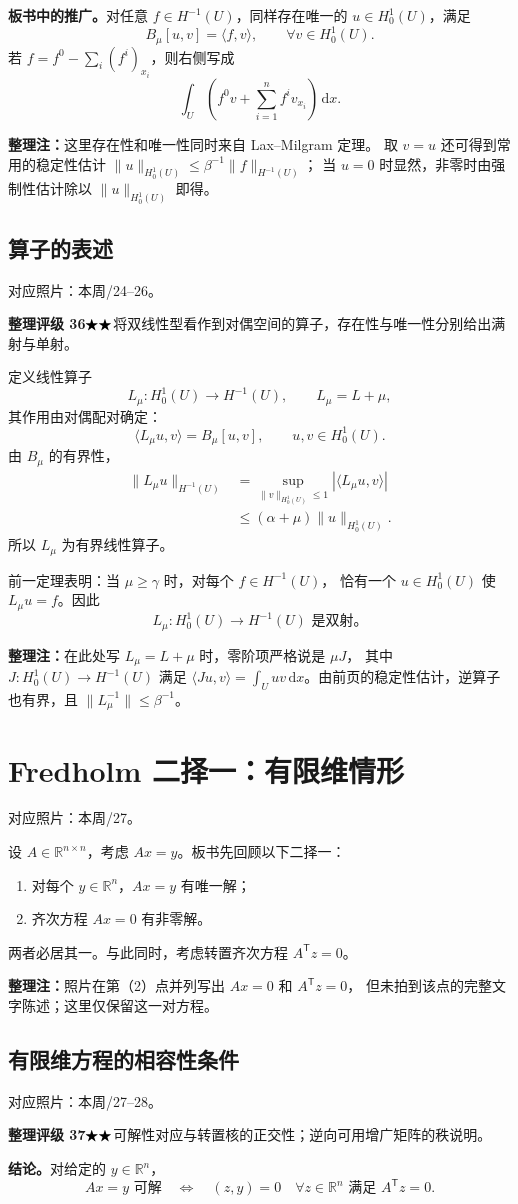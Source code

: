 \documentclass[UTF8,a4paper,11pt,fontset=fandol]{ctexart}
\newcommand{\R}{\mathbb R}
\newcommand{\dd}{\,\mathrm d}
\newcommand{\ednote}[1]{\par{\small\color{notegray}\textbf{整理注：}#1}\par}
\newcommand{\source}[1]{{\small\color{notegray}对应照片：#1。}\par}
\newcommand{\proofstars}[1]{\ensuremath{%
\ifnum#1>0\relax\bigstar\fi
\ifnum#1>1\relax\bigstar\fi
\ifnum#1>2\relax\bigstar\fi
\ifnum#1>3\relax\bigstar\fi
\ifnum#1>4\relax\bigstar\fi}}
\newcommand{\proofrating}[3]{\par{\small\color{proofblue}%
\textbf{整理评级 #1}\enspace\proofstars{#2}\quad #3\par}}
\begin{document}
\textbf{板书中的推广。}对任意 $f\in H^{-1}(U)$，同样存在唯一的
$u\in H_0^1(U)$，满足
\[
\boxed{B_\mu[u,v]=\langle f,v\rangle,\qquad\forall v\in H_0^1(U).}
\]
若 $f=f^0-\sum_i(f^i)_{x_i}$，则右侧写成
\[
\int_U\left(f^0v+\sum_{i=1}^nf^iv_{x_i}\right)\dd x.
\]
\ednote{这里存在性和唯一性同时来自 Lax--Milgram 定理。
取 $v=u$ 还可得到常用的稳定性估计
$\|u\|_{H_0^1(U)}\leq\beta^{-1}\|f\|_{H^{-1}(U)}$；
当 $u=0$ 时显然，非零时由强制性估计除以 $\|u\|_{H_0^1(U)}$ 即得。}

\newpage
\subsection{算子的表述}
\source{本周/24--26}
\proofrating{36}{2}{将双线性型看作到对偶空间的算子，存在性与唯一性分别给出满射与单射。}
定义线性算子
\[
L_\mu:H_0^1(U)\longrightarrow H^{-1}(U),\qquad L_\mu=L+\mu,
\]
其作用由对偶配对确定：
\[
\boxed{\langle L_\mu u,v\rangle=B_\mu[u,v],
\qquad u,v\in H_0^1(U).}
\]
由 $B_\mu$ 的有界性，
\[
\begin{aligned}
\|L_\mu u\|_{H^{-1}(U)}
&=\sup_{\|v\|_{H_0^1(U)}\leq1}|\langle L_\mu u,v\rangle|\\
&\leq(\alpha+\mu)\|u\|_{H_0^1(U)}.
\end{aligned}
\]
所以 $L_\mu$ 为有界线性算子。

前一定理表明：当 $\mu\geq\gamma$ 时，对每个 $f\in H^{-1}(U)$，
恰有一个 $u\in H_0^1(U)$ 使 $L_\mu u=f$。因此
\[
\boxed{L_\mu:H_0^1(U)\longrightarrow H^{-1}(U)\text{ 是双射。}}
\]
\ednote{在此处写 $L_\mu=L+\mu$ 时，零阶项严格说是 $\mu J$，
其中 $J:H_0^1(U)\to H^{-1}(U)$ 满足
$\langle Ju,v\rangle=\int_Uuv\dd x$。由前页的稳定性估计，逆算子也有界，且
$\|L_\mu^{-1}\|\leq\beta^{-1}$。}

\section{Fredholm 二择一：有限维情形}
\source{本周/27}
设 $A\in\R^{n\times n}$，考虑 $Ax=y$。板书先回顾以下二择一：
\begin{enumerate}
\item 对每个 $y\in\R^n$，$Ax=y$ 有唯一解；
\item 齐次方程 $Ax=0$ 有非零解。
\end{enumerate}
两者必居其一。与此同时，考虑转置齐次方程 $A^{\mathsf T}z=0$。
\ednote{照片在第（2）点并列写出 $Ax=0$ 和 $A^{\mathsf T}z=0$，
但未拍到该点的完整文字陈述；这里仅保留这一对方程。}

\newpage
\subsection{有限维方程的相容性条件}
\source{本周/27--28}
\proofrating{37}{2}{可解性对应与转置核的正交性；逆向可用增广矩阵的秩说明。}
\textbf{结论。}对给定的 $y\in\R^n$，
\[
\boxed{Ax=y\text{ 可解}
\quad\Longleftrightarrow\quad
(z,y)=0\quad\forall z\in\R^n\text{ 满足 }A^{\mathsf T}z=0.}
\]
\end{document}
